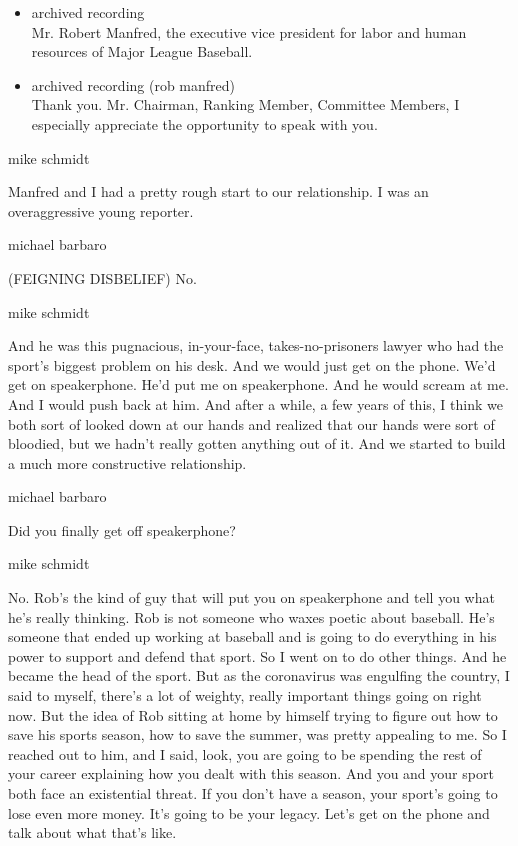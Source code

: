 \begin{itemize}
\item
  archived recording\\
  Mr. Robert Manfred, the executive vice president for labor and human
  resources of Major League Baseball.
\item
  archived recording (rob manfred)\\
  Thank you. Mr. Chairman, Ranking Member, Committee Members, I
  especially appreciate the opportunity to speak with you.
\end{itemize}

mike schmidt

Manfred and I had a pretty rough start to our relationship. I was an
overaggressive young reporter.

michael barbaro

(FEIGNING DISBELIEF) No.

mike schmidt

And he was this pugnacious, in-your-face, takes-no-prisoners lawyer who
had the sport's biggest problem on his desk. And we would just get on
the phone. We'd get on speakerphone. He'd put me on speakerphone. And he
would scream at me. And I would push back at him. And after a while, a
few years of this, I think we both sort of looked down at our hands and
realized that our hands were sort of bloodied, but we hadn't really
gotten anything out of it. And we started to build a much more
constructive relationship.

michael barbaro

Did you finally get off speakerphone?

mike schmidt

No. Rob's the kind of guy that will put you on speakerphone and tell you
what he's really thinking. Rob is not someone who waxes poetic about
baseball. He's someone that ended up working at baseball and is going to
do everything in his power to support and defend that sport. So I went
on to do other things. And he became the head of the sport. But as the
coronavirus was engulfing the country, I said to myself, there's a lot
of weighty, really important things going on right now. But the idea of
Rob sitting at home by himself trying to figure out how to save his
sports season, how to save the summer, was pretty appealing to me. So I
reached out to him, and I said, look, you are going to be spending the
rest of your career explaining how you dealt with this season. And you
and your sport both face an existential threat. If you don't have a
season, your sport's going to lose even more money. It's going to be
your legacy. Let's get on the phone and talk about what that's like.

